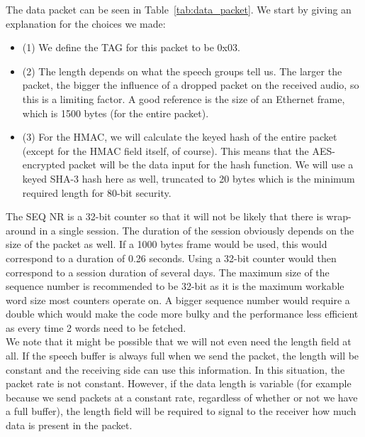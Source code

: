 \documentclass[a4paper]{article}
\begin{document}
The data packet can be seen in Table~\ref{tab:data_packet}. We start by giving an explanation for the choices we made:

\begin{itemize}
    \item (1) We define the TAG for this packet to be 0x03.
    \item (2) The length depends on what the speech groups tell us. The larger the packet, the bigger the influence of a dropped packet on the received audio, so this is a limiting factor. A good reference is the size of an Ethernet frame, which is 1500 bytes (for the entire packet).
    \item (3) For the HMAC, we will calculate the keyed hash of the entire packet (except for the HMAC field itself, of course). This means that the AES-encrypted packet will be the data input for the hash function. We will use a keyed SHA-3 hash here as well, truncated to 20 bytes which is the minimum required length for 80-bit security.
\end{itemize}

The SEQ NR is a 32-bit counter so that it will not be likely that there is wrap-around in a single session. The duration of the session obviously depends on the size of the packet as well. If a 1000 bytes frame would be used, this would correspond to a duration of 0.26 seconds. Using a 32-bit counter would then correspond to a session duration of several days. The maximum size of the sequence number is recommended to be 32-bit as it is the maximum workable word size most counters operate on. A bigger sequence number would require a double which would make the code more bulky and the performance less efficient as every time 2 words need to be fetched.\\

We note that it might be possible that we will not even need the length field at all. If the speech buffer is always full when we send the packet, the length will be constant and the receiving side can use this information. In this situation, the packet rate is not constant. However, if the data length is variable (for example because we send packets at a constant rate, regardless of whether or not we have a full buffer), the length field will be required to signal to the receiver how much data is present in the packet.
\end{document}
